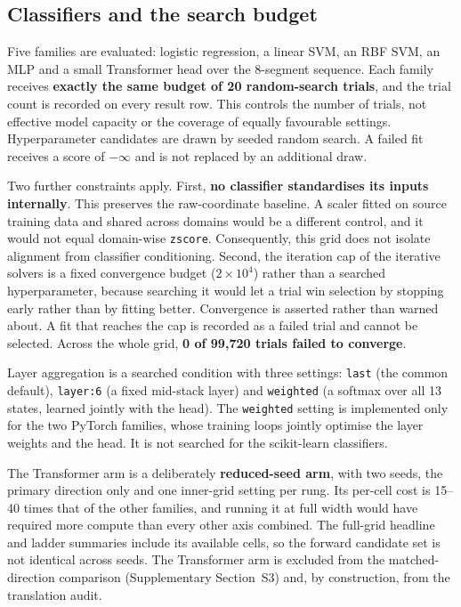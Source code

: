 \subsection{Classifiers and the search budget}
\label{sec:classifiers}

Five families are evaluated: logistic regression, a linear SVM, an RBF SVM, an
MLP and a small Transformer head over the 8-segment sequence. Each family
receives \textbf{exactly the same budget of 20 random-search trials}, and the
trial count is recorded on every result row. This controls the number of
trials, not effective model capacity or the coverage of equally favourable
settings. Hyperparameter candidates are drawn by seeded random search. A failed
fit receives a score of $-\infty$ and is not replaced by an additional draw.

Two further constraints apply. First, \textbf{no classifier standardises its
inputs internally}. This preserves the raw-coordinate baseline. A scaler fitted
on source training data and shared across domains would be a different control,
and it would not equal domain-wise \texttt{zscore}. Consequently, this grid
does not isolate alignment from classifier conditioning. Second, the iteration
cap of the iterative solvers is a fixed convergence budget ($2\times10^4$)
rather than a searched hyperparameter, because searching it would let a trial
win selection by stopping early rather than by fitting better. Convergence is
asserted rather than warned about. A fit that reaches the cap is recorded as a
failed trial and cannot be selected. Across the whole grid,
\textbf{0 of 99{,}720 trials failed to converge}.

Layer aggregation is a searched condition with three settings: \texttt{last}
(the common default), \texttt{layer:6} (a fixed mid-stack layer) and
\texttt{weighted} (a softmax over all 13 states, learned jointly with the
head). The \texttt{weighted} setting is implemented only for the two PyTorch
families, whose training loops jointly optimise the layer weights and the head.
It is not searched for the scikit-learn classifiers.

The Transformer arm is a deliberately \textbf{reduced-seed arm}, with two
seeds, the primary direction only and one inner-grid setting per rung. Its
per-cell cost is 15--40 times that of the other families, and running it at
full width would have required more compute than every other axis combined.
The full-grid headline and ladder summaries include its available cells, so
the forward candidate set is not identical across seeds. The Transformer arm is
excluded from the matched-direction comparison (Supplementary Section~S3) and,
by construction, from the translation audit.

